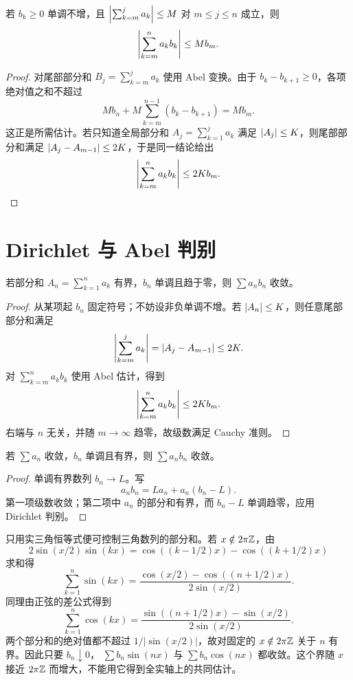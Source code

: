 \begin{corollary}[Abel 估计]
\label{cor:abel-summation-estimate}
若 \(b_k\ge0\) 单调不增，且
\(\left|\sum_{k=m}^j a_k\right|\le M\) 对 \(m\le j\le n\) 成立，则
\[
 \left|\sum_{k=m}^n a_kb_k\right|\le Mb_m.
\]
\end{corollary}

\begin{proof}
对尾部部分和 \(B_j=\sum_{k=m}^j a_k\) 使用 Abel 变换。由于
\(b_k-b_{k+1}\ge0\)，各项绝对值之和不超过
\[
 M b_n+M\sum_{k=m}^{n-1}(b_k-b_{k+1})
 =M b_m.
\]
这正是所需估计。若只知道全局部分和
\(A_j=\sum_{k=1}^j a_k\) 满足 \(\left|A_j\right|\le K\)，则尾部部分和满足
\(\left|A_j-A_{m-1}\right|\le2K\)，于是同一结论给出
\[
 \left|\sum_{k=m}^n a_kb_k\right|\le2K b_m.
\]
\end{proof}

\section{Dirichlet 与 Abel 判别}

\begin{theorem}
\label{thm:series-dirichlet}
若部分和 \(A_n=\sum_{k=1}^n a_k\) 有界，\(b_n\) 单调且趋于零，则
\(\sum a_nb_n\) 收敛。
\end{theorem}

\begin{proof}
从某项起 \(b_n\) 固定符号；不妨设非负单调不增。若
\(\left|A_n\right|\le K\)，则任意尾部部分和满足
\[
 \left|\sum_{k=m}^j a_k\right|
 =\left|A_j-A_{m-1}\right|
 \le2K.
\]
对 \(\sum_{k=m}^n a_kb_k\) 使用 Abel 估计，得到
\[
 \left|\sum_{k=m}^n a_kb_k\right|\le2K b_m.
\]
右端与 \(n\) 无关，并随 \(m\to\infty\) 趋零，故级数满足 Cauchy
准则。
\end{proof}

\begin{theorem}
\label{thm:series-abel}
若 \(\sum a_n\) 收敛，\(b_n\) 单调且有界，则
\(\sum a_nb_n\) 收敛。
\end{theorem}

\begin{proof}
单调有界数列 \(b_n\to L\)。写
\[
 a_nb_n=L a_n+a_n(b_n-L).
\]
第一项级数收敛；第二项中 \(a_n\) 的部分和有界，而
\(b_n-L\) 单调趋零，应用 Dirichlet 判别。
\end{proof}

\begin{example}
只用实三角恒等式便可控制三角数列的部分和。若 \(x\notin2\pi\mathbb{Z}\)，由
\[
 2\sin(x/2)\sin(kx)
 =\cos((k-1/2)x)-\cos((k+1/2)x)
\]
求和得
\[
 \sum_{k=1}^n\sin(kx)
 =\frac{\cos(x/2)-\cos((n+1/2)x)}{2\sin(x/2)}.
\]
同理由正弦的差公式得到
\[
 \sum_{k=1}^n\cos(kx)
 =\frac{\sin((n+1/2)x)-\sin(x/2)}{2\sin(x/2)}.
\]
两个部分和的绝对值都不超过 \(1/|\sin(x/2)|\)，故对固定的
\(x\notin2\pi\mathbb{Z}\) 关于 \(n\) 有界。因此只要 \(b_n\downarrow0\)，
\(\sum b_n\sin(nx)\) 与 \(\sum b_n\cos(nx)\) 都收敛。这个界随
\(x\) 接近 \(2\pi\mathbb{Z}\) 而增大，不能用它得到全实轴上的共同估计。
\end{example}

